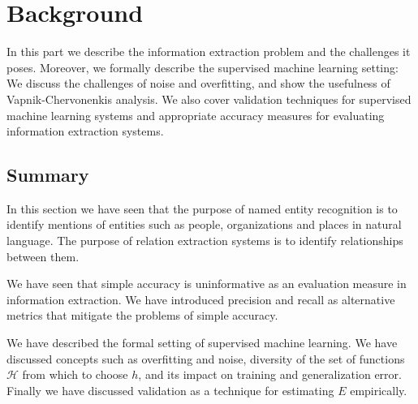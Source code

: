 \chapter{Background}
\label{background}

In this part we describe the information extraction problem and the challenges it poses. Moreover, we formally describe the supervised machine learning setting: We discuss the challenges of noise and overfitting, and show the usefulness of Vapnik-Chervonenkis analysis. We also cover validation techniques for supervised machine learning systems and appropriate accuracy measures for evaluating information extraction systems.




\section{Summary}
In this section we have seen that the purpose of named entity recognition is to identify mentions of entities such as people, organizations and places in natural language. The purpose of relation extraction systems is to identify relationships between them. 

We have seen that simple accuracy is uninformative as an evaluation measure in information extraction. We have introduced precision and recall as alternative metrics that mitigate the problems of simple accuracy.

We have described the formal setting of supervised machine learning. We have discussed concepts such as overfitting and noise, diversity of the set of functions $\mathcal{H}$ from which to choose $h$, and its impact on training and generalization error. Finally we have discussed validation as a technique for estimating $E$ empirically.
